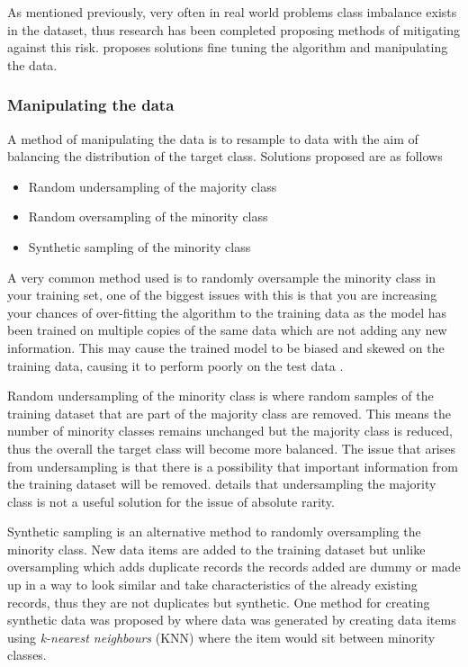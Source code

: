 As mentioned previously, very often in real world problems class imbalance exists in the dataset, thus research has been completed proposing methods of mitigating against this risk. \cite{chawla_editorial:_2004} proposes solutions fine tuning the algorithm and manipulating the data. 

\subsubsection{Manipulating the data} \label{sec:dataManip}

A method of manipulating the data is to resample to data with the aim of balancing the distribution of the target class. Solutions proposed are as follows

\begin{itemize}
	\item Random undersampling of the majority class
	\item Random oversampling of the minority class
	\item Synthetic sampling of the minority class 
\end{itemize}

A very common method used is to randomly oversample the minority class in your training set, one of the biggest issues with this is that you are increasing your chances of over-fitting the algorithm to the training data as the model has been trained on multiple copies of the same data which are not adding any new information. This may cause the trained model to be biased and skewed on the training data, causing it to perform poorly on the test data \cite[See][]{hawkins_problem_2004}.

Random undersampling of the minority class is where random samples of the training dataset that are part of the majority class are removed. This means the number of minority classes remains unchanged but the majority class is reduced, thus the overall the target class will become more balanced. The issue that arises from undersampling is that there is a possibility that important information from the training dataset will be removed. \cite{kennedy_credit_2013} details that undersampling the majority class is not a useful solution for the issue of absolute rarity.

Synthetic sampling is an alternative method to randomly oversampling the minority class. New data items are added to the training dataset but unlike oversampling which adds duplicate records the records added are dummy or made up in a way to look similar and take characteristics of the already existing records, thus they are not duplicates but synthetic. One method for creating synthetic data was proposed by \citep{chawla_smote:_2002} where data was generated by creating data items using \textit{k-nearest neighbours} (KNN) where the item would sit between minority classes.

